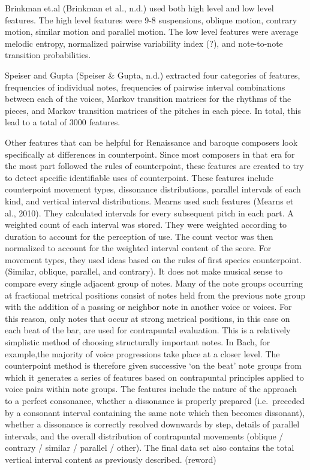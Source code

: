 \documentclass[12pt,twoside]{reedthesis}
\theoremstyle{definition}
\theoremstyle{definition}
\theoremstyle{definition}
\theoremstyle{remark}
\begin{document}
Brinkman et.al (Brinkman et al., n.d.) used both high level and low
level features. The high level features were 9-8 suspensions, oblique
motion, contrary motion, similar motion and parallel motion. The low
level features were average melodic entropy, normalized pairwise
variability index (?), and note-to-note transition probabilities.

Speiser and Gupta (Speiser \& Gupta, n.d.) extracted four categories of
features, frequencies of individual notes, frequencies of pairwise
interval combinations between each of the voices, Markov transition
matrices for the rhythms of the pieces, and Markov transition matrices
of the pitches in each piece. In total, this lead to a total of 3000
features.

Other features that can be helpful for Renaissance and baroque composers
look specifically at differences in counterpoint. Since most composers
in that era for the most part followed the rules of counterpoint, these
features are created to try to detect specific identifiable uses of
counterpoint. These features include counterpoint movement types,
dissonance distributions, parallel intervals of each kind, and vertical
interval distributions. Mearns used such features (Mearns et al., 2010).
They calculated intervals for every subsequent pitch in each part. A
weighted count of each interval was stored. They were weighted according
to duration to account for the perception of use. The count vector was
then normalized to account for the weighted interval content of the
score. For movement types, they used ideas based on the rules of first
species counterpoint. (Similar, oblique, parallel, and contrary). It
does not make musical sense to compare every single adjacent group of
notes. Many of the note groups occurring at fractional metrical
positions consist of notes held from the previous note group with the
addition of a passing or neighbor note in another voice or voices. For
this reason, only notes that occur at strong metrical positions, in this
case on each beat of the bar, are used for contrapuntal evaluation. This
is a relatively simplistic method of choosing structurally important
notes. In Bach, for example,the majority of voice progressions take
place at a closer level. The counterpoint method is therefore given
successive `on the beat' note groups from which it generates a series of
features based on contrapuntal principles applied to voice pairs within
note groups. The features include the nature of the approach to a
perfect consonance, whether a dissonance is properly prepared
(i.e.~preceded by a consonant interval containing the same note which
then becomes dissonant), whether a dissonance is correctly resolved
downwards by step, details of parallel intervals, and the overall
distribution of contrapuntal movements (oblique / contrary / similar /
parallel / other). The final data set also contains the total vertical
interval content as previously described. (reword)
\end{document}
